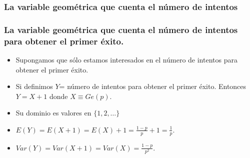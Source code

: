 \documentclass[handout]{beamer}
\theoremstyle{plain}
\theoremstyle{definition}
\begin{document}
\begin{frame}

\subsubsection{La variable geométrica que cuenta el número de intentos}
\frametitle{La variable geométrica que cuenta el número de intentos  para obtener el
primer éxito.}

\begin{itemize}
\item Supongamos que sólo estamos interesados en el número de intentos para obtener el
primer éxito. 
\item Si definimos $Y$= número de  intentos para obtener el  primer éxito. Entonces $Y=X+1$  donde $X\equiv Ge(p)$.
\item Su dominio es
valores en $\{1,2,\ldots\}$ 
\item $E(Y)=E(X+1)=E(X)+1=\frac{1-p}{p}+1=\frac{1}{p}$.
\item $Var(Y)=Var(X+1)=Var(X)=\frac{1-p}{p^2}$.

\end{itemize}
\end{frame}
\end{document}
